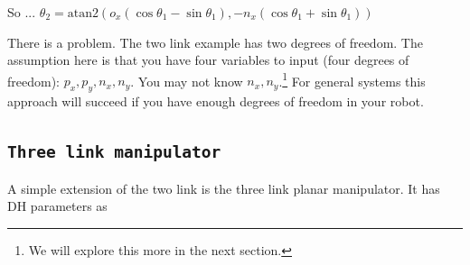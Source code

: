 So ...
\(\theta_2 = \mbox{atan2} \left( o_x(\cos \theta_1 -\sin \theta_1 ), -n_x(\cos \theta_1 +\sin \theta_1 )\right)\)

There is a problem. The two link example has two degrees of freedom. The
assumption here is that you have four variables to input (four degrees
of freedom): \(p_x, p_y, n_x, n_y\). You may not know
\(n_x, n_y\).\footnote{We will explore this more in the next section.}
For general systems this approach will succeed if you have enough
degrees of freedom in your robot.

\hypertarget{three-link-manipulator}{%
\subsection{\texorpdfstring{\texttt{Three\ link\ manipulator}}{Three link manipulator}}\label{three-link-manipulator}}

A simple extension of the two link is the three link planar manipulator.
It has DH parameters as

